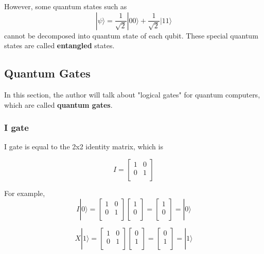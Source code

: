  However, some quantum states such as
 $$ |\psi\rangle = \frac{1}{\sqrt{2}}|00\rangle + \frac{1}{\sqrt{2}}|11\rangle$$ cannot be decomposed into quantum state of each qubit.  These special quantum states are called \textbf{entangled} states.
 
 

\newpage

\subsection{Quantum Gates}

 In this section, the author will talk about "logical gates" for quantum computers, which are called \textbf{quantum gates}.
 
\subsubsection{I gate}

I gate is equal to the 2x2 identity matrix, which is 

$$ I = \begin{bmatrix}
1 & 0 \\
0 & 1 \\
\end{bmatrix}
$$

For example,
$$ I|0\rangle = \begin{bmatrix}
1 & 0 \\
0 & 1 \\
\end{bmatrix} 
\left[
\begin{array}{c}
1 \\
0 \\
\end{array}
\right]
= \left[
\begin{array}{c}
1 \\
0 \\
\end{array}
\right]
= |0\rangle
$$

$$ X|1\rangle = \begin{bmatrix}
1 & 0 \\
0 & 1 \\
\end{bmatrix} 
\left[
\begin{array}{c}
0 \\
1  \\
\end{array}
\right]
= \left[
\begin{array}{c}
0 \\
1 \\
\end{array}
\right]
= |1\rangle
$$



